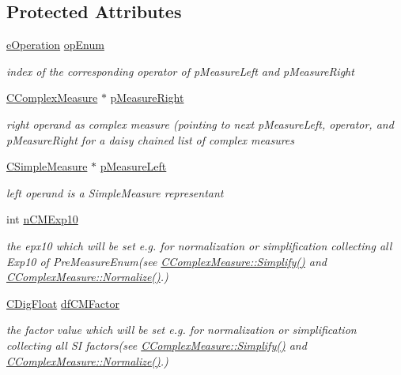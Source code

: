 \subsection*{Protected Attributes}
\begin{DoxyCompactItemize}
\item 
\hyperlink{MeasureOperator_8h_a1431c79e3ad4b4c5bcc9f31f188538f2}{e\+Operation} \hyperlink{classCComplexMeasure_ae22369976a7e5570add11a4172dcf062}{op\+Enum}
\begin{DoxyCompactList}\small\item\em index of the corresponding operator of p\+Measure\+Left and p\+Measure\+Right \end{DoxyCompactList}\item 
\hyperlink{classCComplexMeasure}{C\+Complex\+Measure} $\ast$ \hyperlink{classCComplexMeasure_abbafc4b16676d223ed34860b8ece1b6b}{p\+Measure\+Right}
\begin{DoxyCompactList}\small\item\em right operand as complex measure (pointing to next p\+Measure\+Left, operator, and p\+Measure\+Right for a daisy chained list of complex measures \end{DoxyCompactList}\item 
\hyperlink{classCSimpleMeasure}{C\+Simple\+Measure} $\ast$ \hyperlink{classCComplexMeasure_a4d68f86891a036df81f5b1a344c36f27}{p\+Measure\+Left}
\begin{DoxyCompactList}\small\item\em left operand is a Simple\+Measure representant \end{DoxyCompactList}\item 
int \hyperlink{classCComplexMeasure_a52cfbd26747c0497cfe97c56f2ff38ea}{n\+C\+M\+Exp10}
\begin{DoxyCompactList}\small\item\em the epx10 which will be set e.\+g. for normalization or simplification collecting all Exp10 of Pre\+Measure\+Enum(see \hyperlink{classCComplexMeasure_addb4e69033f2c32fb3bf4a3aef5e1470}{C\+Complex\+Measure\+::\+Simplify()} and \hyperlink{classCComplexMeasure_a87cc1f3c3f0dafd7cbe00634124c8d46}{C\+Complex\+Measure\+::\+Normalize()}.) \end{DoxyCompactList}\item 
\hyperlink{classCDigFloat}{C\+Dig\+Float} \hyperlink{classCComplexMeasure_a21eecd9fd837fb73da2e6994b6c3fefe}{df\+C\+M\+Factor}
\begin{DoxyCompactList}\small\item\em the factor value which will be set e.\+g. for normalization or simplification collecting all SI factors(see \hyperlink{classCComplexMeasure_addb4e69033f2c32fb3bf4a3aef5e1470}{C\+Complex\+Measure\+::\+Simplify()} and \hyperlink{classCComplexMeasure_a87cc1f3c3f0dafd7cbe00634124c8d46}{C\+Complex\+Measure\+::\+Normalize()}.) \end{DoxyCompactList}\end{DoxyCompactItemize}
